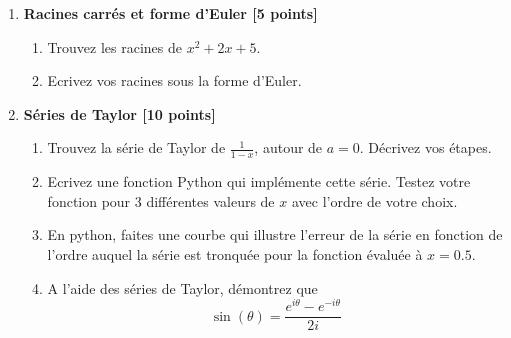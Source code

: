 \documentclass{article}
\begin{document}
\vspace{1cm}
\begin{enumerate}

\item {\bf Racines carrés et forme d'Euler [5 points]}
  \begin{enumerate}
    \item Trouvez les racines de $x^2 + 2x + 5$.

    \item Ecrivez vos racines sous la forme d'Euler.

    \end{enumerate}
\vspace{1cm}
\item {\bf Séries de Taylor [10 points]}
  \begin{enumerate}
    \item Trouvez la série de Taylor de $\displaystyle \frac{1}{1 -
    x}$, autour de $a = 0$. Décrivez vos étapes.


    \item Ecrivez une fonction Python qui implémente cette
      série. Testez votre fonction pour 3 différentes valeurs de $x$
      avec l'ordre de votre choix. 

    \item En python, faites une courbe qui illustre l'erreur de la série en
      fonction de l'ordre auquel la série est tronquée pour la
      fonction évaluée à $x = 0.5$. 

    \item A l'aide des séries de Taylor, démontrez que 
       $$
       \sin(\theta) = \frac{e^{i\theta} - e^{-i\theta}}{2i}
       $$      
      
      
  \end{enumerate}
  

\end{enumerate}
\end{document}
